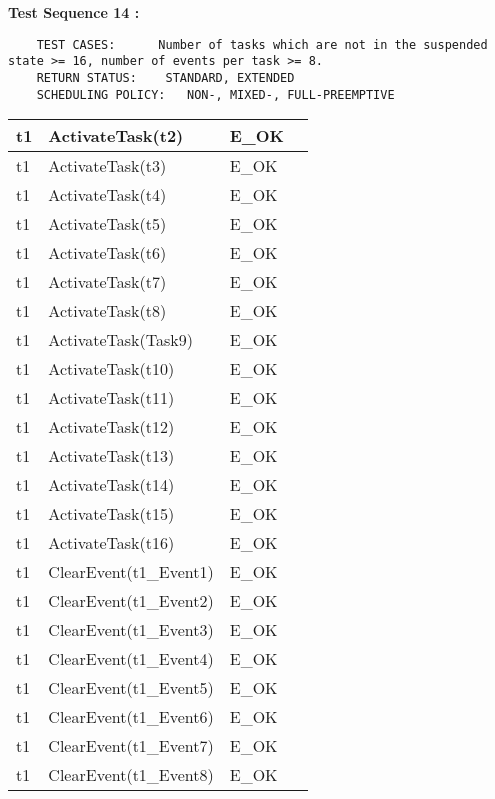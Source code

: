 \documentclass[10pt]{article}
\newlength{\Li}\settowidth{\Li}{Running}
\newlength{\Lii}\setlength{\Lii}{7cm}
\newlength{\Liiii}\setlength{\Liiii}{0.9cm}
\newlength{\Liii}\setlength{\Liii}{\textwidth} \addtolength{\Liii}{-\Li} \addtolength{\Liii}{-\Lii} \addtolength{\Liii}{-\Liiii}
\begin{document}
	\textbf{Test Sequence 14 :}
	\begin{lstlisting}
	TEST CASES:		 Number of tasks which are not in the suspended state >= 16, number of events per task >= 8.
	RETURN STATUS:	  STANDARD, EXTENDED
	SCHEDULING POLICY:   NON-, MIXED-, FULL-PREEMPTIVE
	\end{lstlisting}
	

	\begin{supertabular}{|p{\Li}|p{\Lii}|p{\Liii}|p{\Liiii}|} \hline
	t1	& ActivateTask(t2) 			& E\_OK				& \\ \hline 
	t1	& ActivateTask(t3) 			& E\_OK				& \\ \hline 
	t1	& ActivateTask(t4) 			& E\_OK				& \\ \hline 
	t1	& ActivateTask(t5) 			& E\_OK				& \\ \hline 
	t1	& ActivateTask(t6) 			& E\_OK				& \\ \hline 
	t1	& ActivateTask(t7) 			& E\_OK				& \\ \hline 
	t1	& ActivateTask(t8) 			& E\_OK				& \\ \hline 
	t1	& ActivateTask(Task9) 			& E\_OK				& \\ \hline 
	t1	& ActivateTask(t10) 			& E\_OK				& \\ \hline 
	t1	& ActivateTask(t11) 			& E\_OK				& \\ \hline 
	t1	& ActivateTask(t12) 			& E\_OK				& \\ \hline 
	t1	& ActivateTask(t13) 			& E\_OK				& \\ \hline 
	t1	& ActivateTask(t14) 			& E\_OK				& \\ \hline 
	t1	& ActivateTask(t15) 			& E\_OK				& \\ \hline 
	t1	& ActivateTask(t16) 			& E\_OK				& \\ \hline 
	t1	& ClearEvent(t1\_Event1)		& E\_OK				& \\ \hline 
	t1	& ClearEvent(t1\_Event2)		& E\_OK				& \\ \hline 
	t1	& ClearEvent(t1\_Event3)		& E\_OK				& \\ \hline 
	t1	& ClearEvent(t1\_Event4)		& E\_OK				& \\ \hline 
	t1	& ClearEvent(t1\_Event5)		& E\_OK				& \\ \hline 
	t1	& ClearEvent(t1\_Event6)		& E\_OK				& \\ \hline 
	t1	& ClearEvent(t1\_Event7)		& E\_OK				& \\ \hline 
	t1	& ClearEvent(t1\_Event8)		& E\_OK				& \\ \hline 

\end{supertabular}
\end{document}
